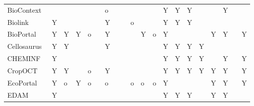 \begin{table}
\begin{tabular}{llllllllllllllllllll}
           BioContext~\cite{biocontext} &                &          &       &            &            &        o &                &               &         &         &         &                          Y &         Y &                 Y &                    &               &               Y &                &               \\
                Biolink~\cite{Unni2022} &              Y &          &       &            &            &        Y &                &               &       o &         &         &                          Y &         Y &                 Y &                    &               &                 &                &               \\
           BioPortal~\cite{Whetzel2011} &              Y &        Y &     Y &          o &            &        Y &                &               &         &       Y &       o &                          Y &           &                   &                    &             Y &               Y &                &             Y \\
         Cellosaurus~\cite{Bairoch2018} &              Y &        Y &       &            &            &        Y &                &               &         &         &         &                          Y &         Y &                 Y &                  Y &               &                 &                &               \\
            CHEMINF~\cite{Hastings2011} &              Y &          &       &            &            &          &                &               &         &         &         &                          Y &         Y &                 Y &                  Y &               &               Y &                &             Y \\
              CropOCT~\cite{Arnaud2020} &              Y &        Y &       &          o &            &        Y &                &               &         &         &         &                          Y &         Y &                 Y &                  Y &             Y &               Y &                &             Y \\
      EcoPortal~\cite{Kechagioglou2021} &              Y &        o &     Y &          o &            &        o &                &               &       o &       o &       o &                          Y &           &                   &                    &             Y &               Y &                &             Y \\
                   EDAM~\cite{Ison2013} &              Y &          &       &            &            &          &                &               &         &         &         &                          Y &         Y &                 Y &                    &             Y &               Y &                &               \\

\end{tabular}
\end{table}
